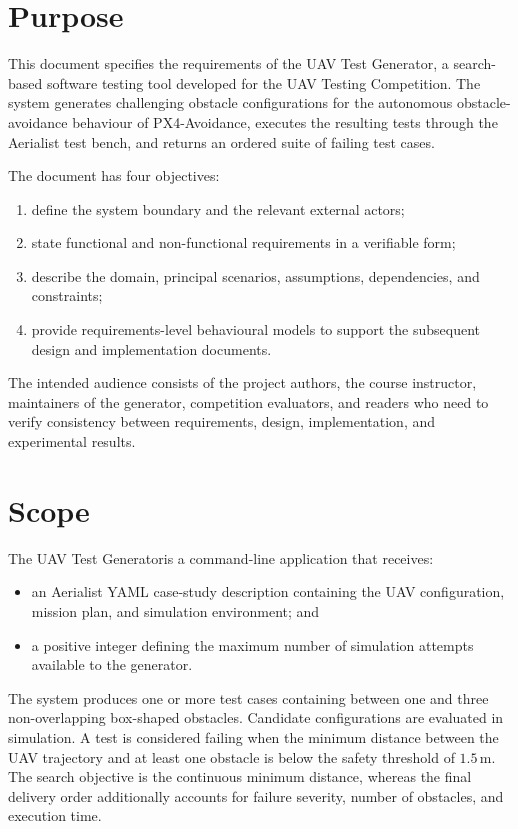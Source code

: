 \documentclass[11pt,a4paper,openany]{report}
\newcommand{\systemname}{UAV Test Generator}
\begin{document}
\section{Purpose}
This document specifies the requirements of the \systemname, a search-based software testing tool developed for the UAV Testing Competition. The system generates challenging obstacle configurations for the autonomous obstacle-avoidance behaviour of PX4-Avoidance, executes the resulting tests through the Aerialist test bench, and returns an ordered suite of failing test cases.

The document has four objectives:
\begin{enumerate}
  \item define the system boundary and the relevant external actors;
  \item state functional and non-functional requirements in a verifiable form;
  \item describe the domain, principal scenarios, assumptions, dependencies, and constraints;
  \item provide requirements-level behavioural models to support the subsequent design and implementation documents.
\end{enumerate}

The intended audience consists of the project authors, the course instructor, maintainers of the generator, competition evaluators, and readers who need to verify consistency between requirements, design, implementation, and experimental results.

\section{Scope}
The \systemname is a command-line application that receives:
\begin{itemize}
  \item an Aerialist YAML case-study description containing the UAV configuration, mission plan, and simulation environment; and
  \item a positive integer defining the maximum number of simulation attempts available to the generator.
\end{itemize}

The system produces one or more test cases containing between one and three non-overlapping box-shaped obstacles. Candidate configurations are evaluated in simulation. A test is considered failing when the minimum distance between the UAV trajectory and at least one obstacle is below the safety threshold of $1.5\,\mathrm{m}$. The search objective is the continuous minimum distance, whereas the final delivery order additionally accounts for failure severity, number of obstacles, and execution time.
\end{document}
